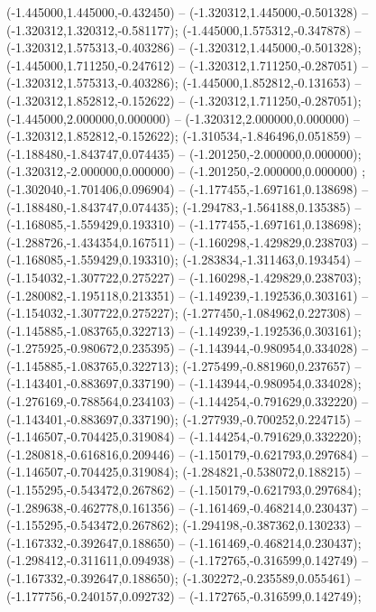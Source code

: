  (-1.445000,1.445000,-0.432450) -- (-1.320312,1.445000,-0.501328) -- (-1.320312,1.320312,-0.581177);
 (-1.445000,1.575312,-0.347878) -- (-1.320312,1.575313,-0.403286) -- (-1.320312,1.445000,-0.501328);
 (-1.445000,1.711250,-0.247612) -- (-1.320312,1.711250,-0.287051) -- (-1.320312,1.575313,-0.403286);
 (-1.445000,1.852812,-0.131653) -- (-1.320312,1.852812,-0.152622) -- (-1.320312,1.711250,-0.287051);
 (-1.445000,2.000000,0.000000) -- (-1.320312,2.000000,0.000000) -- (-1.320312,1.852812,-0.152622);
 (-1.310534,-1.846496,0.051859) -- (-1.188480,-1.843747,0.074435) -- (-1.201250,-2.000000,0.000000);
 (-1.320312,-2.000000,0.000000) -- (-1.201250,-2.000000,0.000000) ;
 (-1.302040,-1.701406,0.096904) -- (-1.177455,-1.697161,0.138698) -- (-1.188480,-1.843747,0.074435);
 (-1.294783,-1.564188,0.135385) -- (-1.168085,-1.559429,0.193310) -- (-1.177455,-1.697161,0.138698);
 (-1.288726,-1.434354,0.167511) -- (-1.160298,-1.429829,0.238703) -- (-1.168085,-1.559429,0.193310);
 (-1.283834,-1.311463,0.193454) -- (-1.154032,-1.307722,0.275227) -- (-1.160298,-1.429829,0.238703);
 (-1.280082,-1.195118,0.213351) -- (-1.149239,-1.192536,0.303161) -- (-1.154032,-1.307722,0.275227);
 (-1.277450,-1.084962,0.227308) -- (-1.145885,-1.083765,0.322713) -- (-1.149239,-1.192536,0.303161);
 (-1.275925,-0.980672,0.235395) -- (-1.143944,-0.980954,0.334028) -- (-1.145885,-1.083765,0.322713);
 (-1.275499,-0.881960,0.237657) -- (-1.143401,-0.883697,0.337190) -- (-1.143944,-0.980954,0.334028);
 (-1.276169,-0.788564,0.234103) -- (-1.144254,-0.791629,0.332220) -- (-1.143401,-0.883697,0.337190);
 (-1.277939,-0.700252,0.224715) -- (-1.146507,-0.704425,0.319084) -- (-1.144254,-0.791629,0.332220);
 (-1.280818,-0.616816,0.209446) -- (-1.150179,-0.621793,0.297684) -- (-1.146507,-0.704425,0.319084);
 (-1.284821,-0.538072,0.188215) -- (-1.155295,-0.543472,0.267862) -- (-1.150179,-0.621793,0.297684);
 (-1.289638,-0.462778,0.161356) -- (-1.161469,-0.468214,0.230437) -- (-1.155295,-0.543472,0.267862);
 (-1.294198,-0.387362,0.130233) -- (-1.167332,-0.392647,0.188650) -- (-1.161469,-0.468214,0.230437);
 (-1.298412,-0.311611,0.094938) -- (-1.172765,-0.316599,0.142749) -- (-1.167332,-0.392647,0.188650);
 (-1.302272,-0.235589,0.055461) -- (-1.177756,-0.240157,0.092732) -- (-1.172765,-0.316599,0.142749);
